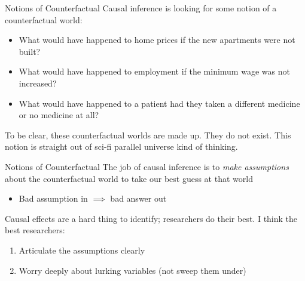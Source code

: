 \documentclass[aspectratio=169,t,11pt,table]{beamer}
\begin{document}
\begin{frame}{Notions of Counterfactual}
  Causal inference is looking for some notion of a \alert{counterfactual} world:
  \begin{itemize}
    \item What would have happened to home prices if the new apartments were not built? 
    
    \item What would have happened to employment if the minimum wage was not increased? 
    
    \item What would have happened to a patient had they taken a different medicine or no medicine at all?
  \end{itemize}

  To be clear, these counterfactual worlds are \alert{made up}. They do not exist. This notion is straight out of sci-fi parallel universe kind of thinking.
\end{frame}

\begin{frame}{Notions of Counterfactual}
  The job of causal inference is to \emph{make assumptions} about the counterfactual world to take our best guess at that world
  \begin{itemize}
    \item Bad assumption in $\implies$ bad answer out
  \end{itemize}

  \bigskip
  Causal effects are a hard thing to identify; researchers do their best. I think the best researchers:
  \begin{enumerate}
    \item Articulate the assumptions clearly
    
    \item Worry deeply about lurking variables (not sweep them under)
  \end{enumerate}
\end{frame}
\end{document}
